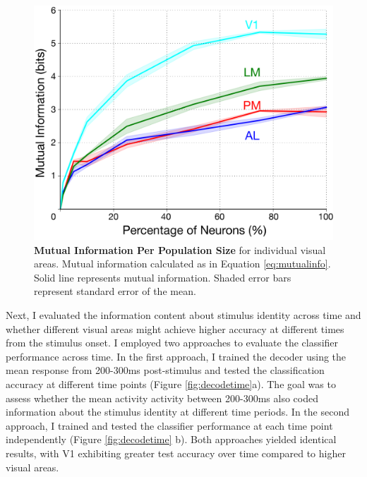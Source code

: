 \begin{figure}
  \centering
   \includegraphics[width=\textwidth]{Figures/chapter5/mutual_info_pop.png}
  \caption[Mutual Information Per Population Size]{\textbf{Mutual Information Per Population Size} for individual visual areas. Mutual information calculated as in Equation \ref{eq:mutualinfo}. Solid line represents mutual information. Shaded error bars represent standard error of the mean.}
   \label{fig:mutualinfopop}
\end{figure}
Next, I evaluated the information content about stimulus identity across time and whether different visual areas might achieve higher accuracy at different times from the stimulus onset. I employed two approaches to evaluate the classifier performance across time. In the first approach, I trained the decoder using the mean response from 200-300ms post-stimulus and tested the classification accuracy at different time points (Figure \ref{fig:decodetime}a). The goal was to assess whether the mean activity activity between 200-300ms also coded information about the stimulus identity at different time periods. In the second approach, I trained and tested the classifier performance at each time point independently (Figure \ref{fig:decodetime} b). Both approaches yielded identical results, with V1 exhibiting greater test accuracy over time compared to higher visual areas.\par 

